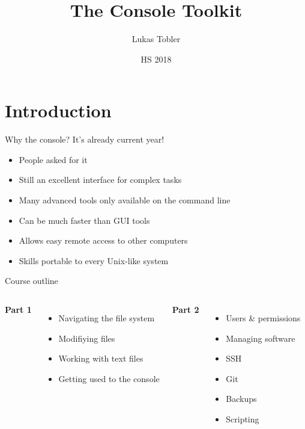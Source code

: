 

\title{The Console Toolkit}
\author{Lukas Tobler}
\date{HS 2018}


	\begin{frame}
		\titlepage%
	\end{frame}

    \section{Introduction}

    \begin{frame}[t,fragile]{Why the console? It's already current year!}
        \begin{itemize}
            \item People asked for it
            \item Still an excellent interface for complex tasks
            \item Many advanced tools only available on the command line
            \item Can be much faster than GUI tools
            \item Allows easy remote access to other computers
            \item Skills portable to every Unix-like system
        \end{itemize}
    \end{frame}

    \begin{frame}[t,fragile]{Course outline}
        \begin{columns}[T]
            \textbf{Part 1}
            \begin{itemize}
                \item Navigating the file system
                \item Modifiying files
                \item Working with text files
                \item Getting used to the console
            \end{itemize}
            \textbf{Part 2}
            \begin{itemize}
                \item{Users \& permissions}
                \item{Managing software}
                \item{SSH}
                \item{Git}
                \item{Backups}
                \item{Scripting}
            \end{itemize}
        \end{columns}
    \end{frame}

